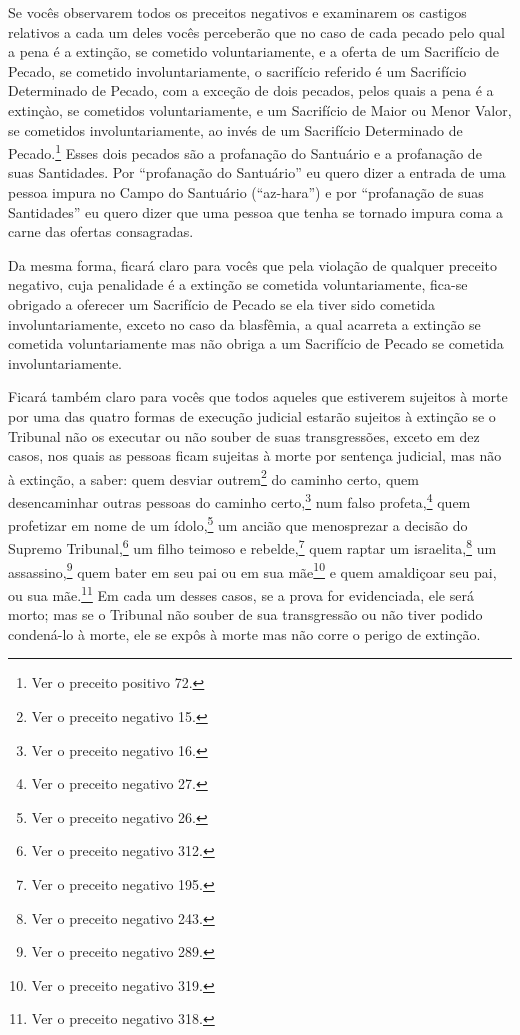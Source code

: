 Se vocês observarem todos os preceitos negativos e examinarem os
castigos relativos a cada um deles vocês perceberão que no caso de cada
pecado pelo qual a pena é a extinção, se cometido voluntariamente, e a
oferta de um Sacrifício de Pecado, se cometido involuntariamente, o
sacrifício referido é um Sacrifício Determinado de Pecado, com a exceção
de dois pecados, pelos quais a pena é a extinçào, se cometidos
voluntariamente, e um Sacrifício de Maior ou Menor Valor, se cometidos
involuntariamente, ao invés de um Sacrifício Determinado de
Pecado.\footnote{Ver o preceito positivo 72.} Esses dois pecados são a profanação do
Santuário e a profanação de suas Santidades. Por ``profanação do
Santuário'' eu quero dizer a entrada de uma pessoa impura no Campo do
Santuário (``az-hara'') e por ``profanação de suas Santidades'' eu quero
dizer que uma pessoa que tenha se tornado impura coma a carne das
ofertas consagradas.

Da mesma forma, ficará claro para vocês que pela violação de qualquer
preceito negativo, cuja penalidade é a extinção se cometida
voluntariamente, fica-se obrigado a oferecer um Sacrifício de Pecado se
ela tiver sido cometida involuntariamente, exceto no caso da blasfêmia,
a qual acarreta a extinção se cometida voluntariamente mas não obriga a
um Sacrifício de Pecado se cometida involuntariamente.

Ficará também claro para vocês que todos aqueles que estiverem sujeitos
à morte por uma das quatro formas de execução judicial estarão sujeitos
à extinção se o Tribunal não os executar ou não souber de suas
transgressões, exceto em dez casos, nos quais as pessoas ficam sujeitas
à morte por sentença judicial, mas não à extinção, a saber: quem desviar
outrem\footnote{Ver o preceito negativo 15.} do caminho certo, quem desencaminhar outras
pessoas do caminho certo,\footnote{Ver o preceito negativo 16.} num falso
profeta,\footnote{Ver o preceito negativo 27.} quem profetizar em nome de um ídolo,\footnote{Ver o preceito negativo 26.} um ancião
que menosprezar a decisão do Supremo Tribunal,\footnote{Ver o preceito negativo 312.} um
filho teimoso e rebelde,\footnote{Ver o preceito negativo 195.} quem raptar um
israelita,\footnote{Ver o preceito negativo 243.} um assassino,\footnote{Ver o preceito negativo 289.}
quem bater em seu pai ou em sua mãe\footnote{Ver o preceito negativo 319.} e quem
amaldiçoar seu pai, ou sua mãe.\footnote{Ver o preceito negativo 318.} Em cada um desses
casos, se a prova for evidenciada, ele será morto; mas se o Tribunal não
souber de sua transgressão ou não tiver podido condená-lo à morte, ele
se expôs à morte mas não corre o perigo de extinção.


